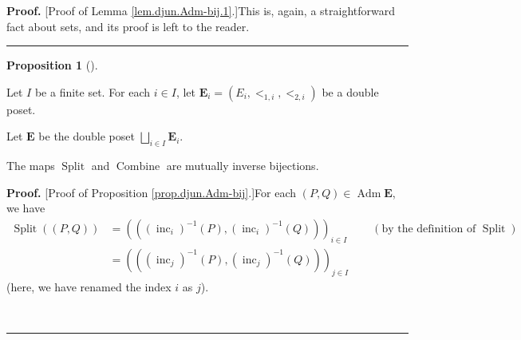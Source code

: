 \documentclass[numbers=enddot,12pt,final,onecolumn,notitlepage,abstracton]{scrartcl}
\theoremstyle{definition}
\newtheorem{prop}[theo]{Proposition}
\newenvironment{proposition}[1][]
{\begin{prop}[#1]\begin{leftbar}}
{\end{leftbar}\end{prop}}
\newenvironment{proof}[1][Proof]{\noindent\textbf{#1.} }{\ \rule{0.5em}{0.5em}}
\newenvironment{verlong}{}{}
\begin{document}
\begin{verlong}
\begin{footnotesize}
\begin{proof}
[Proof of Lemma \ref{lem.djun.Adm-bij.1}.]This is, again, a straightforward
fact about sets, and its proof is left to the reader.
\end{proof}

\begin{proposition}
\label{prop.djun.Adm-bij}Let $I$ be a finite set. For each $i\in I$, let
$\mathbf{E}_{i}=\left(  E_{i},<_{1,i},<_{2,i}\right)  $ be a double poset.

Let $\mathbf{E}$ be the double poset $\bigsqcup_{i\in I}\mathbf{E}_{i}$.

The maps $\operatorname*{Split}$ and $\operatorname*{Combine}$ are mutually
inverse bijections.
\end{proposition}

\begin{proof}
[Proof of Proposition \ref{prop.djun.Adm-bij}.]For each $\left(  P,Q\right)
\in\operatorname*{Adm}\mathbf{E}$, we have
\begin{align}
\operatorname*{Split}\left(  \left(  P,Q\right)  \right)   &  =\left(  \left(
\left(  \operatorname*{inc}\nolimits_{i}\right)  ^{-1}\left(  P\right)
,\left(  \operatorname*{inc}\nolimits_{i}\right)  ^{-1}\left(  Q\right)
\right)  \right)  _{i\in I}\ \ \ \ \ \ \ \ \ \ \left(  \text{by the definition
of }\operatorname*{Split}\right) \nonumber\\
&  =\left(  \left(  \left(  \operatorname*{inc}\nolimits_{j}\right)
^{-1}\left(  P\right)  ,\left(  \operatorname*{inc}\nolimits_{j}\right)
^{-1}\left(  Q\right)  \right)  \right)  _{j\in I}
\label{pf.prop.djun.Adm-bij.Split-rewr}%
\end{align}
(here, we have renamed the index $i$ as $j$).


\end{proof}
\end{footnotesize}
\end{verlong}
\end{document}
